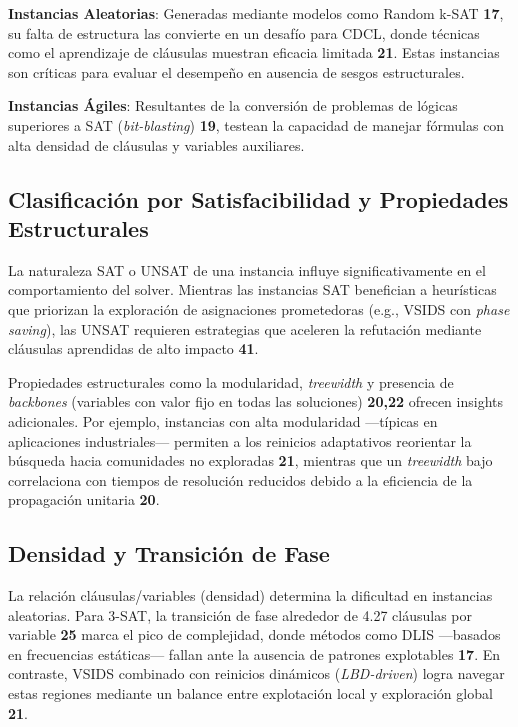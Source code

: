 \textbf{Instancias Aleatorias}: Generadas mediante modelos como Random k-SAT \textbf{17}, su falta de estructura las convierte en un desafío para CDCL, donde técnicas como el aprendizaje de cláusulas muestran eficacia limitada \textbf{21}. Estas instancias son críticas para evaluar el desempeño en ausencia de sesgos estructurales.

\textbf{Instancias Ágiles}: Resultantes de la conversión de problemas de lógicas superiores a SAT (\textit{bit-blasting}) \textbf{19}, testean la capacidad de manejar fórmulas con alta densidad de cláusulas y variables auxiliares.

\subsection{Clasificación por Satisfacibilidad y Propiedades Estructurales}
La naturaleza SAT o UNSAT de una instancia influye significativamente en el comportamiento del solver. Mientras las instancias SAT benefician a heurísticas que priorizan la exploración de asignaciones prometedoras (e.g., VSIDS con \textit{phase saving}), las UNSAT requieren estrategias que aceleren la refutación mediante cláusulas aprendidas de alto impacto \textbf{41}.

Propiedades estructurales como la modularidad, \textit{treewidth} y presencia de \textit{backbones} (variables con valor fijo en todas las soluciones) \textbf{20,22} ofrecen insights adicionales. Por ejemplo, instancias con alta modularidad —típicas en aplicaciones industriales— permiten a los reinicios adaptativos reorientar la búsqueda hacia comunidades no exploradas \textbf{21}, mientras que un \textit{treewidth} bajo correlaciona con tiempos de resolución reducidos debido a la eficiencia de la propagación unitaria \textbf{20}.

\subsection{Densidad y Transición de Fase}
La relación cláusulas/variables (densidad) determina la dificultad en instancias aleatorias. Para 3-SAT, la transición de fase alrededor de 4.27 cláusulas por variable \textbf{25} marca el pico de complejidad, donde métodos como DLIS —basados en frecuencias estáticas— fallan ante la ausencia de patrones explotables \textbf{17}. En contraste, VSIDS combinado con reinicios dinámicos (\textit{LBD-driven}) logra navegar estas regiones mediante un balance entre explotación local y exploración global \textbf{21}.

